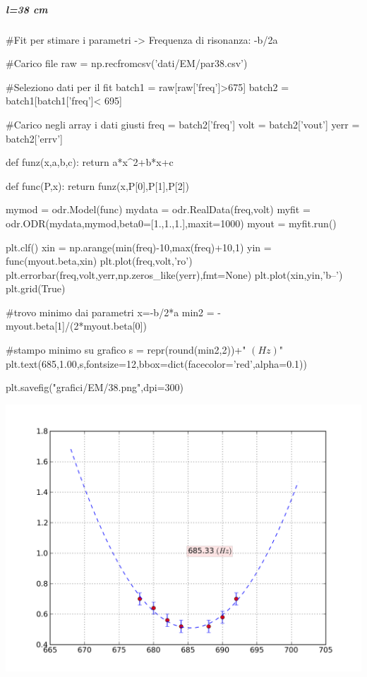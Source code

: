 \subparagraph*{l=38 cm}

\begin{sagesilent}
#Fit per stimare i parametri -> Frequenza di risonanza: -b/2a

#Carico file
raw = np.recfromcsv('dati/EM/par38.csv')

#Seleziono dati per il fit
batch1 = raw[raw['freq']>675]
batch2 = batch1[batch1['freq']< 695]

#Carico negli array i dati giusti
freq = batch2['freq']
volt = batch2['vout']
yerr = batch2['errv']


def funz(x,a,b,c):
    return a*x^2+b*x+c

def func(P,x):
    return funz(x,P[0],P[1],P[2])

mymod = odr.Model(func)
mydata = odr.RealData(freq,volt)
myfit = odr.ODR(mydata,mymod,beta0=[1.,1.,1.],maxit=1000)
myout = myfit.run()

plt.clf()
xin = np.arange(min(freq)-10,max(freq)+10,1)
yin = func(myout.beta,xin)
plt.plot(freq,volt,'ro')
plt.errorbar(freq,volt,yerr,np.zeros_like(yerr),fmt=None)
plt.plot(xin,yin,'b--')
plt.grid(True)

#trovo minimo dai parametri x=-b/2*a
min2 = -myout.beta[1]/(2*myout.beta[0]) 

#stampo minimo su grafico
s = repr(round(min2,2))+" $(Hz)$"
plt.text(685,1.00,s,fontsize=12,bbox=dict(facecolor='red',alpha=0.1))

plt.savefig("grafici/EM/38.png",dpi=300)

\end{sagesilent}

\includegraphics[scale=0.75]{grafici/EM/38.png}

